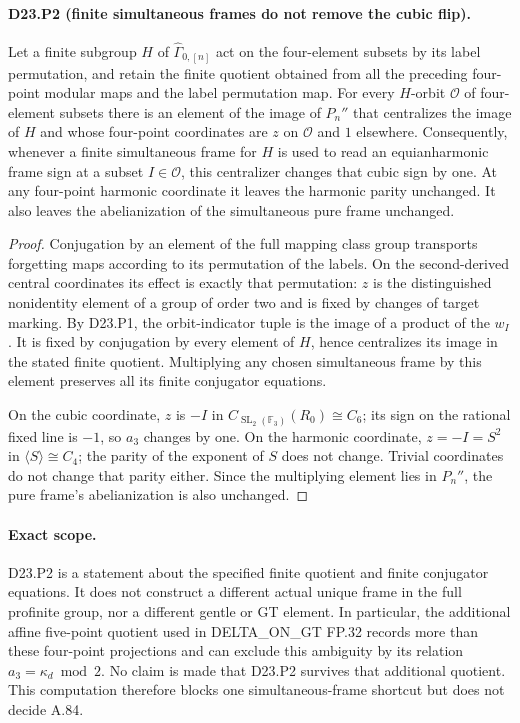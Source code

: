 \paragraph{D23.P2 (finite simultaneous frames do not remove the cubic flip).}
Let a finite subgroup $H$ of $\widehat\Gamma_{0,[n]}$ act on the
four-element subsets by its label permutation, and retain the finite
quotient obtained from all the preceding four-point modular maps
and the label permutation map. For every $H$-orbit $\mathcal O$ of
four-element subsets there is an element of the image of $P_n''$
that centralizes the image of $H$ and whose four-point coordinates
are $z$ on $\mathcal O$ and $1$ elsewhere.
Consequently, whenever a finite simultaneous frame for $H$ is used to
read an equianharmonic frame sign at a subset $I\in\mathcal O$,
this centralizer changes that cubic sign by one. At any four-point
harmonic coordinate it leaves the harmonic parity unchanged. It also
leaves the abelianization of the simultaneous pure frame unchanged.

\begin{proof}
Conjugation by an element of the full mapping class group transports
forgetting maps according to its permutation of the labels. On the
second-derived central coordinates its effect is exactly that
permutation: $z$ is the distinguished nonidentity element of a group
of order two and is fixed by changes of target marking. By D23.P1,
the orbit-indicator tuple is the image of a product of the $w_I$.
It is fixed by conjugation by every element of $H$, hence centralizes
its image in the stated finite quotient. Multiplying any chosen
simultaneous frame by this element preserves all its finite
conjugator equations.

On the cubic coordinate, $z$ is $-I$ in
$C_{\operatorname{SL}_2(\mathbb F_3)}(R_0)\cong C_6$; its sign
on the rational fixed line is $-1$, so $a_3$ changes by one.
On the harmonic coordinate, $z=-I=S^2$ in
$\langle S\rangle\cong C_4$; the parity of the exponent of $S$
does not change. Trivial coordinates do not change that parity
either. Since the multiplying element lies in $P_n''$, the pure
frame's abelianization is also unchanged.
\end{proof}

\paragraph{Exact scope.}
D23.P2 is a statement about the specified finite quotient and finite
conjugator equations. It does not construct a different actual
unique frame in the full profinite group, nor a different gentle
or GT element. In particular, the additional affine five-point
quotient used in DELTA\_ON\_GT FP.32 records more than these
four-point projections and can exclude this ambiguity by its
relation $a_3=\kappa_d\bmod2$. No claim is made that D23.P2
survives that additional quotient. This computation therefore
blocks one simultaneous-frame shortcut but does not decide A.84.
